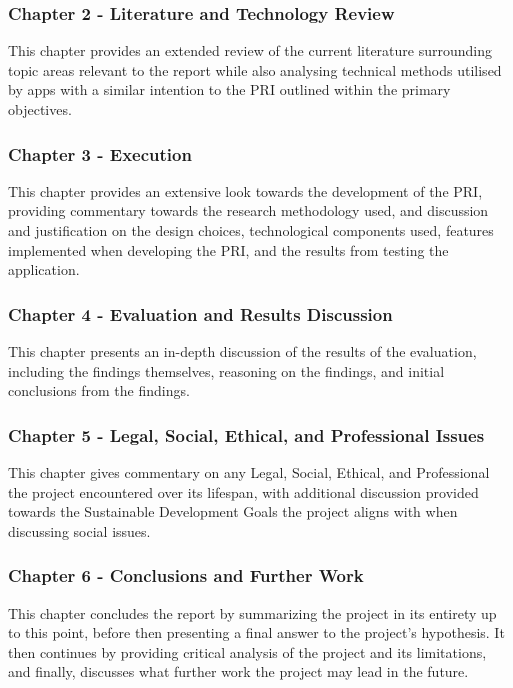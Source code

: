 \documentclass[12pt]{article}
\begin{document}
\subsubsection{Chapter 2 - Literature and Technology Review}
This chapter provides an extended review of the current literature surrounding topic areas relevant to the report while also
analysing technical methods utilised by apps with a similar intention to the PRI outlined within the primary objectives.

\subsubsection{Chapter 3 - Execution}
This chapter provides an extensive look towards the development of the PRI, providing commentary towards the research methodology
used, and discussion and justification on the design choices, technological components used, features implemented when developing the PRI, and
the results from testing the application.

\subsubsection{Chapter 4 - Evaluation and Results Discussion}
This chapter presents an in-depth discussion of the results of the evaluation, including the findings themselves, reasoning on the 
findings, and initial conclusions from the findings.

\subsubsection{Chapter 5 - Legal, Social, Ethical, and Professional Issues}
This chapter gives commentary on any Legal, Social, Ethical, and Professional the project encountered over its lifespan, with
additional discussion provided towards the Sustainable Development Goals the project aligns with when discussing social issues.

\subsubsection{Chapter 6 - Conclusions and Further Work}
This chapter concludes the report by summarizing the project in its entirety up to this point, before then presenting a final answer 
to the project's hypothesis. It then continues by providing critical analysis of the project and its limitations, and finally, discusses 
what further work the project may lead in the future.
\end{document}
